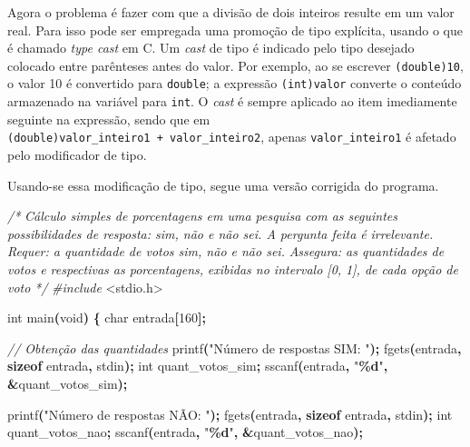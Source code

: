 \documentclass[
  11pt,
  a4paper,
]{scrbook}
\newenvironment{Shaded}{\begin{snugshade}}{\end{snugshade}}
\newcommand{\CommentTok}[1]{\textcolor[rgb]{0.56,0.35,0.01}{\textit{#1}}}
\newcommand{\DataTypeTok}[1]{\textcolor[rgb]{0.13,0.29,0.53}{#1}}
\newcommand{\DecValTok}[1]{\textcolor[rgb]{0.00,0.00,0.81}{#1}}
\newcommand{\ImportTok}[1]{#1}
\newcommand{\KeywordTok}[1]{\textcolor[rgb]{0.13,0.29,0.53}{\textbf{#1}}}
\newcommand{\NormalTok}[1]{#1}
\newcommand{\OperatorTok}[1]{\textcolor[rgb]{0.81,0.36,0.00}{\textbf{#1}}}
\newcommand{\PreprocessorTok}[1]{\textcolor[rgb]{0.56,0.35,0.01}{\textit{#1}}}
\newcommand{\SpecialCharTok}[1]{\textcolor[rgb]{0.81,0.36,0.00}{\textbf{#1}}}
\newcommand{\StringTok}[1]{\textcolor[rgb]{0.31,0.60,0.02}{#1}}
\begin{document}
Agora o problema é fazer com que a divisão de dois inteiros resulte em
um valor real. Para isso pode ser empregada uma promoção de tipo
explícita, usando o que é chamado \emph{type cast} em C. Um \emph{cast}
de tipo é indicado pelo tipo desejado colocado entre parênteses antes do
valor. Por exemplo, ao se escrever \texttt{(double)10}, o valor 10 é
convertido para \texttt{double}; a expressão \texttt{(int)valor}
converte o conteúdo armazenado na variável para \texttt{int}. O
\emph{cast} é sempre aplicado ao item imediamente seguinte na expressão,
sendo que em \texttt{(double)valor\_inteiro1\ +\ valor\_inteiro2},
apenas \texttt{valor\_inteiro1} é afetado pelo modificador de tipo.

Usando-se essa modificação de tipo, segue uma versão corrigida do
programa.

\begin{Shaded}
\begin{Highlighting}[]
\CommentTok{/*}
\CommentTok{Cálculo simples de porcentagens em uma pesquisa com as seguintes }
\CommentTok{    possibilidades de resposta: sim, não e não sei. A pergunta feita é}
\CommentTok{    irrelevante.}
\CommentTok{Requer: a quantidade de votos sim, não e não sei.}
\CommentTok{Assegura: as quantidades de votos e respectivas as porcentagens,}
\CommentTok{    exibidas no intervalo [0, 1], de cada opção de voto}
\CommentTok{*/}
\PreprocessorTok{\#include }\ImportTok{\textless{}stdio.h\textgreater{}}

\DataTypeTok{int}\NormalTok{ main}\OperatorTok{(}\DataTypeTok{void}\OperatorTok{)} \OperatorTok{\{}
    \DataTypeTok{char}\NormalTok{ entrada}\OperatorTok{[}\DecValTok{160}\OperatorTok{];}

    \CommentTok{// Obtenção das quantidades}
\NormalTok{    printf}\OperatorTok{(}\StringTok{"Número de respostas SIM: "}\OperatorTok{);}
\NormalTok{    fgets}\OperatorTok{(}\NormalTok{entrada}\OperatorTok{,} \KeywordTok{sizeof}\NormalTok{ entrada}\OperatorTok{,}\NormalTok{ stdin}\OperatorTok{);}
    \DataTypeTok{int}\NormalTok{ quant\_votos\_sim}\OperatorTok{;}
\NormalTok{    sscanf}\OperatorTok{(}\NormalTok{entrada}\OperatorTok{,} \StringTok{"}\SpecialCharTok{\%d}\StringTok{"}\OperatorTok{,} \OperatorTok{\&}\NormalTok{quant\_votos\_sim}\OperatorTok{);}

\NormalTok{    printf}\OperatorTok{(}\StringTok{"Número de respostas NÃO: "}\OperatorTok{);}
\NormalTok{    fgets}\OperatorTok{(}\NormalTok{entrada}\OperatorTok{,} \KeywordTok{sizeof}\NormalTok{ entrada}\OperatorTok{,}\NormalTok{ stdin}\OperatorTok{);}
    \DataTypeTok{int}\NormalTok{ quant\_votos\_nao}\OperatorTok{;}
\NormalTok{    sscanf}\OperatorTok{(}\NormalTok{entrada}\OperatorTok{,} \StringTok{"}\SpecialCharTok{\%d}\StringTok{"}\OperatorTok{,} \OperatorTok{\&}\NormalTok{quant\_votos\_nao}\OperatorTok{);}


\end{Highlighting}
\end{Shaded}
\end{document}
